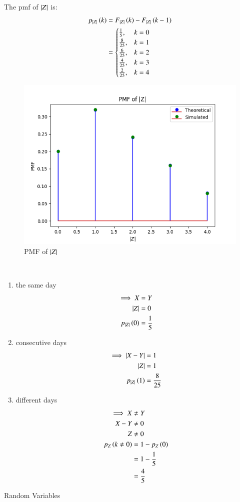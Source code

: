 \documentclass[journal,12pt,onecolumn]{IEEEtran}
\theoremstyle{remark}
\begin{document}
The pmf of $\left\vert Z\right\vert$ is:
\begin{align}
	p_{\left\vert Z\right\vert}\left(k\right) &= F_{\left\vert Z\right\vert}\left(k\right) - F_{\left\vert Z\right\vert}\left(k-1\right)\\
	&= \begin{cases}
		\frac{1}{5}, & k = 0\\
		\frac{8}{25}, & k = 1\\
		\frac{6}{25}, & k = 2\\
		\frac{4}{25}, & k = 3\\
		\frac{2}{25}, & k = 4
	\end{cases}
\end{align}
\begin{figure}[!ht]
\centering
\includegraphics[width=\columnwidth]{./figs/figure2.png}
\caption{PMF of $\left\vert Z\right\vert$}
\end{figure}
\\
\begin{enumerate}[label=(\roman*)]
	\item the same day
	\begin{align}
	\implies X &= Y\\
	\left\vert Z\right\vert &= 0\\
	p_{\left\vert Z\right\vert}\left(0\right) &= \frac{1}{5}
	\end{align}
	\item consecutive days
	\begin{align}
	\implies \left\vert X - Y\right\vert &= 1\\
	\left\vert Z\right\vert &= 1\\
	p_{\left\vert Z\right\vert}\left(1\right) &= \frac{8}{25}
	\end{align}
	\item different days
	\begin{align}
	\implies X &\neq Y\\
	X - Y &\neq 0\\
	Z &\neq 0 \\
	p_{Z}\left(k \neq 0\right) &= 1 - p_{Z}\left(0\right)\\
	&= 1 - \frac{1}{5}\\
	&= \frac{4}{5}
	\end{align}
\end{enumerate}

\begin{table}[!ht]                             
  
\caption{Random Variables}
\end{table}
\end{document}
